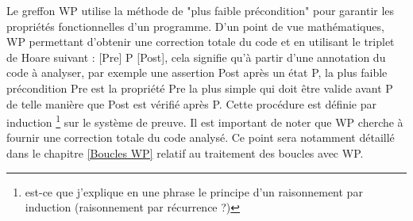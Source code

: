 Le greffon WP utilise la méthode de "plus faible précondition" pour garantir les propriétés fonctionnelles d'un programme.  D'un point de vue mathématiques, WP permettant d'obtenir une correction totale du code et en utilisant le triplet de Hoare suivant : [Pre] P [Post], cela signifie qu'à partir d'une annotation du code à analyser, par exemple une assertion Post après un état P, la plus faible précondition Pre est la propriété Pre la plus simple qui doit être valide avant P de telle manière que Post est vérifié après P. Cette procédure est définie par induction \footnote{est-ce que j'explique en une phrase le principe d'un raisonnement par induction (raisonnement par récurrence ?) } sur le système de preuve. Il est important de noter que WP cherche à fournir une correction totale du code analysé. Ce point sera notamment détaillé dans le chapitre \ref{Boucles WP} relatif au traitement des boucles avec WP.






